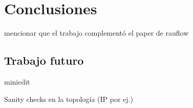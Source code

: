 \chapter{Conclusiones}

\graphicspath{{Chapter5/Figs/}}

mencionar que el trabajo complementó el paper de rauflow

\section{Trabajo futuro}
miniedit

Sanity checks en la topología (IP por ej.)